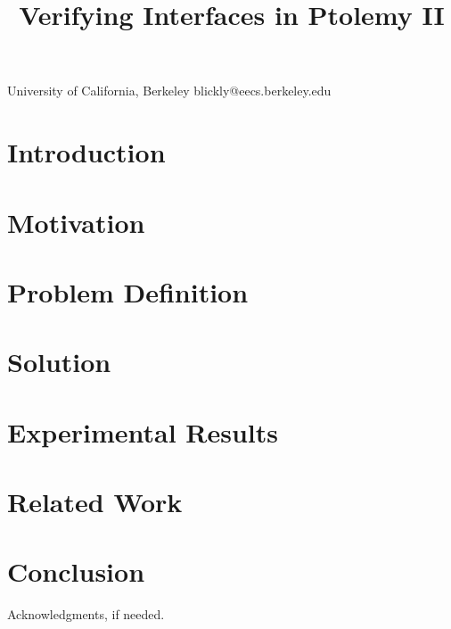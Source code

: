\documentclass[preprint,11pt]{sigplanconf}
\begin{document}
\title{Verifying Interfaces in Ptolemy II}

           {University of California, Berkeley}
           {blickly@eecs.berkeley.edu}

\maketitle

\begin{abstract}
\end{abstract}

\section{Introduction}
\cite{realationalInterfaces}
\section{Motivation}
\section{Problem Definition}
\section{Solution}
\section{Experimental Results}
\section{Related Work}
\section{Conclusion}

\acks

Acknowledgments, if needed.




\end{document}
